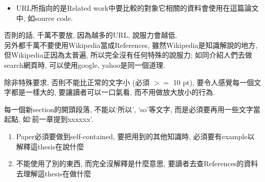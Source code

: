 \begin{enumerate}
{\begin{itemize}
{\begin{itemize}
          \item
          {
            URL所指向的是Related work中要比較的對象它相關的資料會使用在這篇論文中, 如source code.
          } %
        \end{itemize}

        否則的話, 千萬不要放, 因為越多的URL, 說服力會越低.\\
 
        另外都千萬不要使用Wikipedia當成References, 雖然Wikipedia是知識解說的地方, 但Wikipedia正因為太普遍, 所以完全沒有任何特殊的說服力; 如同介紹人們去做search網頁時, 可以使用google, yahoo是同一個道理.
      } %
    \end{itemize}
  } %
\end{enumerate}


除非特殊要求, 否則不能比正常的文字小 (必須 $ >= $ 10 pt), 要令人感覺每一個文字都是一樣大的, 要讓讀者可以一口氣看, 而不用做放大放小的行為.


每一個新section的開頭段落, 不能以`所以', `so'等文字, 而是必須要再用一些文字當起點, 如`前一章提到xxxxxx'.


\begin{enumerate}
  \item
  {
    Paper必須要做到self-contained, 要把用到的其他知識時, 必須要有example以解釋這thesis在說什麼
  } %

  \item
  {
    不能使用了別的東西, 而完全沒解釋是什麼意思, 要讀者去查References的資料去理解這thesis在做什麼
  } %
\end{enumerate}


